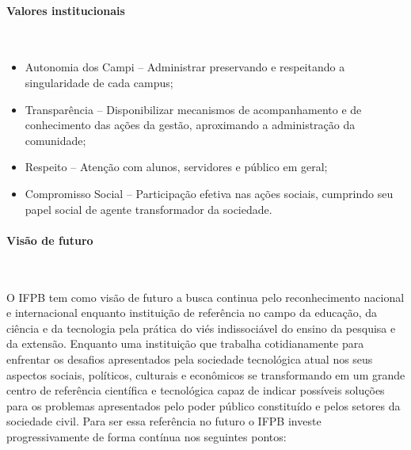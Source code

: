 \paragraph{Valores institucionais}\

\begin{itemize}
  \item Autonomia dos Campi – Administrar preservando e respeitando a singularidade de cada campus;
  \item Transparência – Disponibilizar mecanismos de acompanhamento e de conhecimento das ações da gestão, aproximando a administração da comunidade;
  \item Respeito – Atenção com alunos, servidores e público em geral;
  \item Compromisso Social – Participação efetiva nas ações sociais, cumprindo seu papel social de agente transformador da sociedade.
\end{itemize}

\paragraph{Visão de futuro}\

O IFPB tem como visão de futuro a busca continua pelo reconhecimento nacional e internacional enquanto instituição de referência no campo da educação, da ciência e da tecnologia pela prática do viés indissociável do ensino da pesquisa e da extensão. Enquanto uma instituição que trabalha cotidianamente para enfrentar os desafios apresentados pela sociedade tecnológica atual nos seus aspectos sociais, políticos, culturais e econômicos se transformando em um grande centro de referência científica e tecnológica capaz de indicar possíveis soluções para os problemas apresentados pelo poder público constituído e pelos setores da sociedade civil. Para ser essa referência no futuro o IFPB investe progressivamente de forma contínua nos seguintes pontos:

